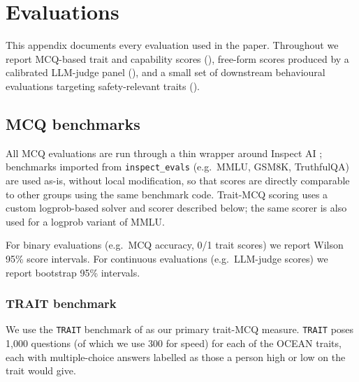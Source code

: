 \section{Evaluations}\label{sec:appendix-e}

This appendix documents every evaluation used in the paper. Throughout we report MCQ-based trait and capability scores (), free-form scores produced by a calibrated LLM-judge panel (), and a small set of downstream behavioural evaluations targeting safety-relevant traits ().

\subsection{MCQ benchmarks}\label{sec:appendix-e-mcq}

All MCQ evaluations are run through a thin wrapper around Inspect AI \citep{inspectevals2024}; benchmarks imported from \texttt{inspect\_evals} (e.g.\ MMLU, GSM8K, TruthfulQA) are used as-is, without local modification, so that scores are directly comparable to other groups using the same benchmark code. Trait-MCQ scoring uses a custom logprob-based solver and scorer described below; the same scorer is also used for a logprob variant of MMLU.

For binary evaluations (e.g.\ MCQ accuracy, 0/1 trait scores) we report Wilson 95\% score intervals. For continuous evaluations (e.g.\ LLM-judge scores) we report bootstrap 95\% intervals.

\subsubsection{TRAIT benchmark}\label{sec:appendix-e-mcq-trait}

We use the \texttt{TRAIT} benchmark of \citet{lee2024trait} as our primary trait-MCQ measure. \texttt{TRAIT} poses 1{,}000 questions (of which we use 300 for speed) for each of the OCEAN traits, each with multiple-choice answers labelled as those a person high or low on the trait would give.

